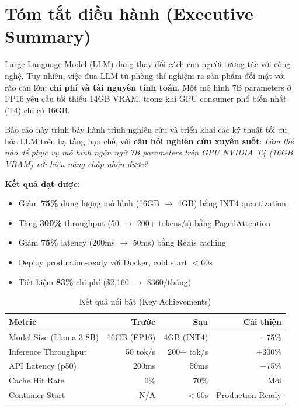 \documentclass[12pt,a4paper]{report}
\begin{document}
\chapter*{Tóm tắt điều hành (Executive Summary)}

\begin{infobox}
Large Language Model (LLM) đang thay đổi cách con người tương tác với công nghệ. Tuy nhiên, việc đưa LLM từ phòng thí nghiệm ra sản phẩm đối mặt với rào cản lớn: \textbf{chi phí và tài nguyên tính toán}. Một mô hình 7B parameters ở FP16 yêu cầu tối thiểu 14GB VRAM, trong khi GPU consumer phổ biến nhất (T4) chỉ có 16GB.

Báo cáo này trình bày hành trình nghiên cứu và triển khai các kỹ thuật tối ưu hóa LLM trên hạ tầng hạn chế, với \textbf{câu hỏi nghiên cứu xuyên suốt}: \textit{Làm thế nào để phục vụ mô hình ngôn ngữ 7B parameters trên GPU NVIDIA T4 (16GB VRAM) với hiệu năng chấp nhận được?}

\textbf{Kết quả đạt được:}
\begin{itemize}
  \item Giảm \textbf{75\%} dung lượng mô hình (16GB $\rightarrow$ 4GB) bằng INT4 quantization
  \item Tăng \textbf{300\%} throughput (50 $\rightarrow$ 200+ tokens/s) bằng PagedAttention
  \item Giảm \textbf{75\%} latency (200ms $\rightarrow$ 50ms) bằng Redis caching
  \item Deploy production-ready với Docker, cold start $<$60s
  \item Tiết kiệm \textbf{83\%} chi phí (\$2,160 $\rightarrow$ \$360/tháng)
\end{itemize}
\end{infobox}

\vspace{0.5cm}

\begin{table}[h]
\centering
\caption{Kết quả nổi bật (Key Achievements)}
\label{tab:key-achievements}
\begin{tabular}{lrrr}
\toprule
\textbf{Metric} & \textbf{Trước} & \textbf{Sau} & \textbf{Cải thiện} \\
\midrule
Model Size (Llama-3-8B) & 16GB (FP16) & 4GB (INT4) & $-$75\% \\
Inference Throughput & 50 tok/s & 200+ tok/s & $+$300\% \\
API Latency (p50) & 200ms & 50ms & $-$75\% \\
Cache Hit Rate & 0\% & 70\% & Mới \\
Container Start & N/A & $<$60s & Production Ready \\
\bottomrule
\end{tabular}
\end{table}
\end{document}
